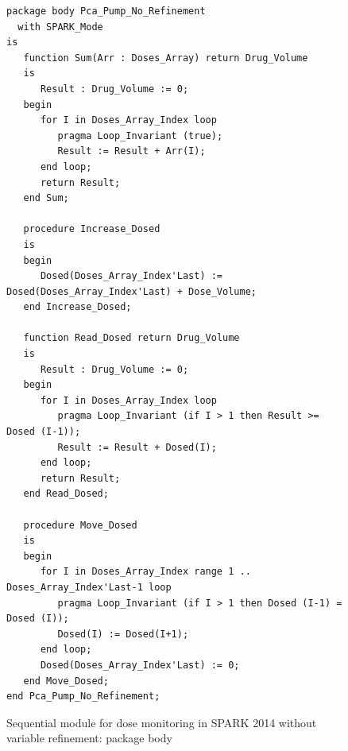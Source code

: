 \begin{figure}
\singlespacing
\begin{lstlisting}[language=ada2012, frame=single, gobble=0]
package body Pca_Pump_No_Refinement
  with SPARK_Mode
is
   function Sum(Arr : Doses_Array) return Drug_Volume
   is
      Result : Drug_Volume := 0;
   begin
      for I in Doses_Array_Index loop
         pragma Loop_Invariant (true);
         Result := Result + Arr(I);
      end loop;
      return Result;
   end Sum;

   procedure Increase_Dosed
   is
   begin
      Dosed(Doses_Array_Index'Last) := Dosed(Doses_Array_Index'Last) + Dose_Volume;
   end Increase_Dosed;

   function Read_Dosed return Drug_Volume
   is
      Result : Drug_Volume := 0;
   begin
      for I in Doses_Array_Index loop
         pragma Loop_Invariant (if I > 1 then Result >= Dosed (I-1));
         Result := Result + Dosed(I);
      end loop;
      return Result;
   end Read_Dosed;

   procedure Move_Dosed
   is
   begin
      for I in Doses_Array_Index range 1 .. Doses_Array_Index'Last-1 loop
         pragma Loop_Invariant (if I > 1 then Dosed (I-1) = Dosed (I));
         Dosed(I) := Dosed(I+1);
      end loop;
      Dosed(Doses_Array_Index'Last) := 0;
   end Move_Dosed;
end Pca_Pump_No_Refinement;
\end{lstlisting}
\doublespacing
\caption{Sequential module for dose monitoring in SPARK 2014 without variable refinement: package body}
\label{listing:pca_pump_move_dosed_unit_spark2014_no_refinement_body}
\end{figure}

